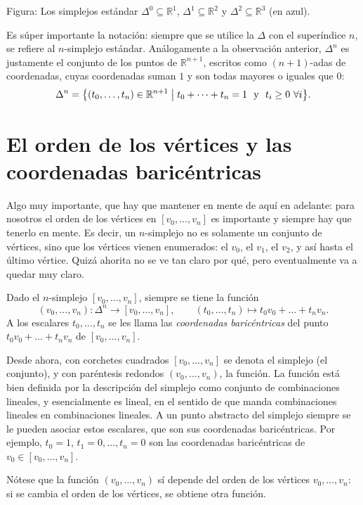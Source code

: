 \documentclass[11pt]{article}
\begin{document}
\noindent Figura: Los simplejos estándar $\Delta^0\subseteq\mathbb R^1$, $\Delta^1\subseteq\mathbb R^2$ y $\Delta^2\subseteq\mathbb R^3$ (en azul).

Es súper importante la notación: siempre que se utilice la $\Delta$ con el superíndice $n$, se refiere al $n$-simplejo estándar. Análogamente a la observación anterior, $\Delta^n$ es justamente el conjunto de los puntos de $\mathbb R^{n+1}$, escritos como $(n+1)$-adas de coordenadas, cuyas coordenadas suman $1$ y son todas mayores o iguales que $0$:
\[
  \Delta^n=\bigl\{(t_0,\dots,t_n)\in\mathbb R^{n+1} \bigm| t_0+\dots+t_n=1\ \text{ y }\ t_i\ge 0\ \forall i\bigr\}.
\]

\section*{El orden de los vértices y las coordenadas baricéntricas}

Algo muy importante, que hay que mantener en mente de aquí en adelante: para nosotros el orden de los vértices en $[v_0,\dots,v_n]$ es importante y siempre hay que tenerlo en mente. Es decir, un $n$-simplejo no es solamente un conjunto de vértices, sino que los vértices vienen enumerados: el $v_0$, el $v_1$, el $v_2$, y así hasta el último vértice. Quizá ahorita no se ve tan claro por qué, pero eventualmente va a quedar muy claro.

\begin{defn}\label{defn:baricentricas}
Dado el $n$-simplejo $[v_0,\dots,v_n]$, siempre se tiene la función
\[
  (v_0,\dots,v_n)\colon\Delta^n\longrightarrow[v_0,\dots,v_n],\qquad (t_0,\dots,t_n)\longmapsto t_0v_0+\dots+t_nv_n .
\]
A los escalares $t_0,\dots,t_n$ se les llama las \emph{coordenadas baricéntricas} del punto $t_0v_0+\dots+t_nv_n$ de $[v_0,\dots,v_n]$.
\end{defn}

Desde ahora, con corchetes cuadrados $[v_0,\dots,v_n]$ se denota el simplejo (el conjunto), y con paréntesis redondos $(v_0,\dots,v_n)$, la función. La función está bien definida por la descripción del simplejo como conjunto de combinaciones lineales, y esencialmente es lineal, en el sentido de que manda combinaciones lineales en combinaciones lineales. A un punto abstracto del simplejo siempre se le pueden asociar estos escalares, que son sus coordenadas baricéntricas. Por ejemplo, $t_0=1$, $t_1=0,\dots,t_n=0$ son las coordenadas baricéntricas de $v_0\in[v_0,\dots,v_n]$.

Nótese que la función $(v_0,\dots,v_n)$ sí depende del orden de los vértices $v_0,\dots,v_n$: si se cambia el orden de los vértices, se obtiene otra función.
\end{document}
